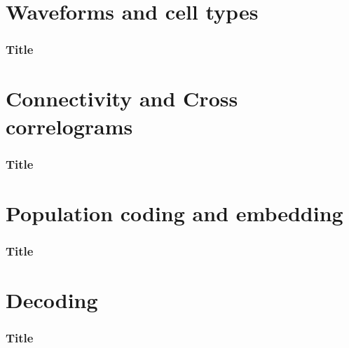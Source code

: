 \documentclass[handout,aspectratio=169]{beamer}
\begin{document}
\section[Waveforms and cell types]{Waveforms and cell types}

\begin{frame}
	\frametitle{Title}
		\begin{center}
	\end{center}
\end{frame} 


\section[Connectivity and Cross correlograms]{Connectivity and Cross correlograms}

\begin{frame}
	\frametitle{Title}
		\begin{center}
	\end{center}
\end{frame} 


\section[Population coding and embedding]{Population coding and embedding}

\begin{frame}
	\frametitle{Title}
		\begin{center}
	\end{center}
\end{frame} 


\section[Decoding]{Decoding}

\begin{frame}
	\frametitle{Title}
		\begin{center}
	\end{center}
\end{frame} 
\end{document}
